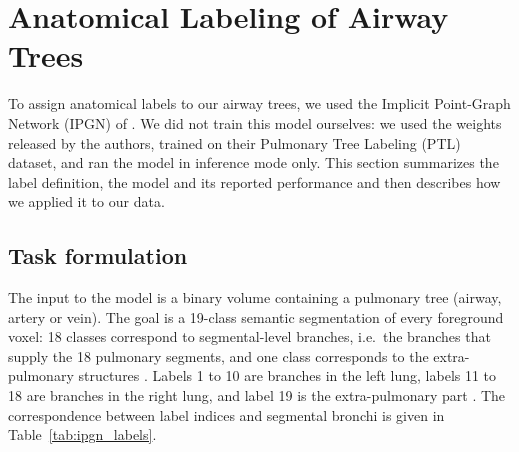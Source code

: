 \section[Labelling]{Anatomical Labeling of Airway Trees}
\label{sec:labeling}                     %

To assign anatomical labels to our airway trees, we used the Implicit Point-Graph Network
(IPGN) of \citet{xie2025}. We did not train this model ourselves: we used the weights
released by the authors, trained on their Pulmonary Tree Labeling (PTL) dataset, and ran the
model in inference mode only. This section summarizes the label definition, the model and its
reported performance and then describes how we applied it to our data.

\subsection{Task formulation}            %
\label{sec:labeling_task}                %

The input to the model is a binary volume containing a pulmonary tree (airway, artery or
vein). The goal is a 19-class semantic segmentation of every foreground voxel: 18 classes
correspond to segmental-level branches, i.e.\ the branches that supply the 18 pulmonary
segments, and one class corresponds to the extra-pulmonary structures \cite{xie2025}. Labels
1 to 10 are branches in the left lung, labels 11 to 18 are branches in the right lung, and
label 19 is the extra-pulmonary part \cite{xie2025}. The correspondence between label indices
and segmental bronchi is given in Table~\ref{tab:ipgn_labels}.

